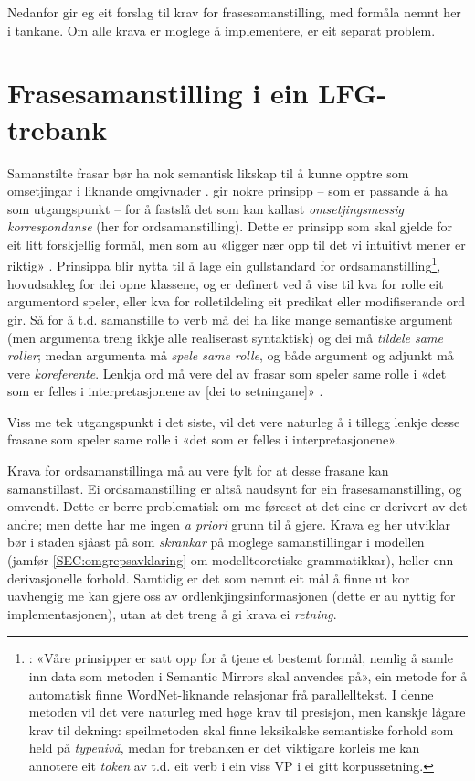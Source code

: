 \documentclass[12pt,a4paper,oneside,draft]{report}
\begin{document}
Nedanfor gir eg eit forslag til krav for frasesamanstilling, med
 formåla nemnt her i tankane. Om alle krava er moglege å implementere,
 er eit separat problem.

\section{Frasesamanstilling i ein LFG-trebank}
\label{sec-3.3}


Samanstilte frasar bør ha nok semantisk likskap til å kunne opptre som
omsetjingar i liknande omgivnader
\citep[s.~74]{dyvik2009lmp}. \citet{thunes2003eal} gir nokre prinsipp
-- som er passande å ha som utgangspunkt -- for å fastslå det som kan
kallast \emph{omsetjingsmessig korrespondanse} (her for
ordsamanstilling). Dette er prinsipp som skal gjelde for eit litt
forskjellig formål, men som au «ligger nær opp til det vi intuitivt
mener er riktig» \citep[s.~2]{thunes2003eal}. Prinsippa blir nytta til
å lage ein gullstandard for ordsamanstilling\footnote{\cite[s.~2]{thunes2003eal}: «Våre prinsipper er satt
       opp for å tjene et bestemt formål, nemlig å samle inn data som
       metoden i Semantic Mirrors skal anvendes på», ein metode for å
       automatisk finne WordNet-liknande relasjonar frå
       parallelltekst. I denne metoden vil det vere naturleg med høge
       krav til presisjon, men kanskje lågare krav til dekning:
       speilmetoden skal finne leksikalske semantiske forhold som held
       på \emph{typenivå}, medan for trebanken er det viktigare korleis me
       kan annotere eit \emph{token} av t.d. eit verb i ein viss VP i ei
       gitt korpussetning. },
hovudsakleg for dei opne klassene, og er definert ved å vise til kva
for rolle eit argumentord speler, eller kva for rolletildeling eit
predikat eller modifiserande ord gir. Så for å t.d. samanstille to
verb må dei ha like mange semantiske argument (men argumenta treng
ikkje alle realiserast syntaktisk) og dei må \emph{tildele same roller};
medan argumenta må \emph{spele same rolle}, og både argument og adjunkt må
vere \emph{koreferente}. Lenkja ord må vere del av frasar som speler same
rolle i «det som er felles i interpretasjonene av [dei to setningane]»
\citep[s.~3]{thunes2003eal}.


Viss me tek utgangspunkt i det siste, vil det vere naturleg å i
tillegg lenkje desse frasane som speler same rolle i «det som er
felles i interpretasjonene».

Krava for ordsamanstillinga må au vere fylt for at desse frasane kan
samanstillast. Ei ordsamanstilling er altså naudsynt for ein
frasesamanstilling, og omvendt. Dette er berre problematisk om me
føreset at det eine er derivert av det andre; men dette har me ingen
\emph{a priori} grunn til å gjere. Krava eg her utviklar bør i staden
sjåast på som \emph{skrankar} på moglege samanstillingar i modellen (jamfør
\ref{SEC:omgrepsavklaring} om modellteoretiske grammatikkar), heller
enn derivasjonelle forhold. Samtidig er det som nemnt eit mål å finne
ut kor uavhengig me kan gjere oss av ordlenkjingsinformasjonen (dette
er au nyttig for implementasjonen), utan at det treng å gi krava ei
\emph{retning}.
\end{document}
